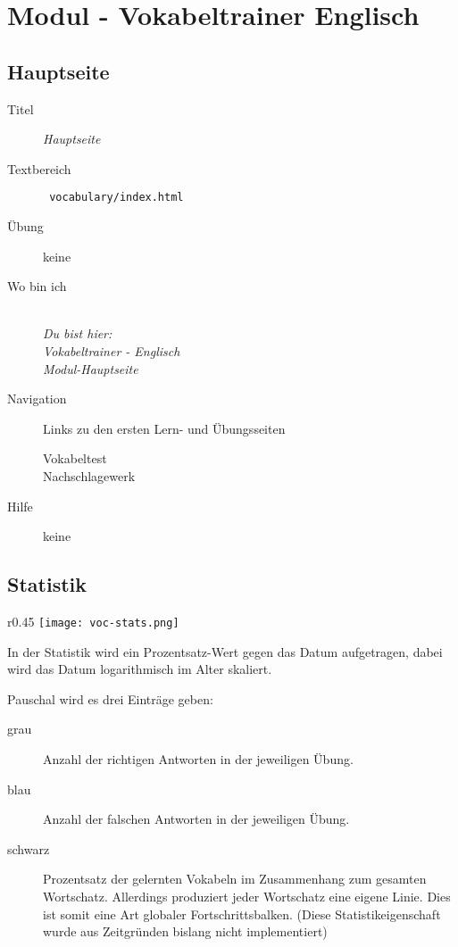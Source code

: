 \chapter{ Modul - Vokabeltrainer Englisch }
\label{has:voc-module}

\section{ Hauptseite }
\label{has:voc-module-mainpage}
\begin{description}
	\item[Titel] \emph{ Hauptseite }
	\item[Textbereich] \texttt{ vocabulary/index.html }
	\item[Übung] keine
	\item[Wo bin ich] \emph{\\Du bist hier:\\Vokabeltrainer - Englisch\\Modul-Hauptseite}
	\item[Navigation] Links zu den ersten Lern- und Übungsseiten
	\begin{description}
		\item[Vokabeltest] 
		\item[Nachschlagewerk] 
	\end{description}
	\item[Hilfe] keine
\end{description}

\section{ Statistik }
\label{has:voc-module-stats}
\begin{wrapfigure}{r}{0.45\textwidth}
	\texttt{[image: voc-stats.png]}
\end{wrapfigure}
In der Statistik wird ein Prozentsatz-Wert gegen das Datum aufgetragen, dabei wird das Datum logarithmisch im Alter skaliert.

Pauschal wird es drei Einträge geben:
\begin{description}
	\item[grau] Anzahl der richtigen Antworten in der jeweiligen Übung.
	\item[blau] Anzahl der falschen Antworten in der jeweiligen Übung.
	\item[schwarz] Prozentsatz der gelernten Vokabeln im Zusammenhang zum gesamten Wortschatz. Allerdings produziert jeder Wortschatz eine eigene Linie. Dies ist somit eine Art globaler Fortschrittsbalken. (Diese Statistikeigenschaft wurde aus Zeitgründen bislang nicht implementiert)
\end{description}


